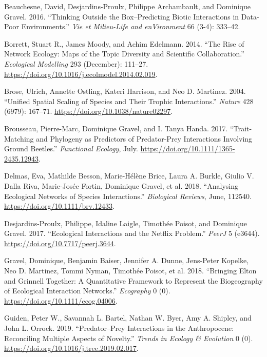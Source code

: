 \leavevmode\hypertarget{ref-BeauDesj16}{}%
Beauchesne, David, Desjardins-Proulx, Philippe Archambault, and
Dominique Gravel. 2016. ``Thinking Outside the Box--Predicting Biotic
Interactions in Data-Poor Environments.'' \emph{Vie et Milieu-Life and
enVironment} 66 (3-4): 333--42.

\leavevmode\hypertarget{ref-BorrMood14}{}%
Borrett, Stuart R., James Moody, and Achim Edelmann. 2014. ``The Rise of
Network Ecology: Maps of the Topic Diversity and Scientific
Collaboration.'' \emph{Ecological Modelling} 293 (December): 111--27.
\url{https://doi.org/10.1016/j.ecolmodel.2014.02.019}.

\leavevmode\hypertarget{ref-BrosOstl04}{}%
Brose, Ulrich, Annette Ostling, Kateri Harrison, and Neo D. Martinez.
2004. ``Unified Spatial Scaling of Species and Their Trophic
Interactions.'' \emph{Nature} 428 (6979): 167--71.
\url{https://doi.org/10.1038/nature02297}.

\leavevmode\hypertarget{ref-BrouGrav17}{}%
Brousseau, Pierre-Marc, Dominique Gravel, and I. Tanya Handa. 2017.
``Trait-Matching and Phylogeny as Predictors of Predator-Prey
Interactions Involving Ground Beetles.'' \emph{Functional Ecology},
July. \url{https://doi.org/10.1111/1365-2435.12943}.

\leavevmode\hypertarget{ref-DelmBess18}{}%
Delmas, Eva, Mathilde Besson, Marie-Hélène Brice, Laura A. Burkle,
Giulio V. Dalla Riva, Marie-Josée Fortin, Dominique Gravel, et al. 2018.
``Analysing Ecological Networks of Species Interactions.''
\emph{Biological Reviews}, June, 112540.
\url{https://doi.org/10.1111/brv.12433}.

\leavevmode\hypertarget{ref-DesjLaig17}{}%
Desjardins-Proulx, Philippe, Idaline Laigle, Timothée Poisot, and
Dominique Gravel. 2017. ``Ecological Interactions and the Netflix
Problem.'' \emph{PeerJ} 5 (e3644).
\url{https://doi.org/10.7717/peerj.3644}.

\leavevmode\hypertarget{ref-GravBais18}{}%
Gravel, Dominique, Benjamin Baiser, Jennifer A. Dunne, Jens-Peter
Kopelke, Neo D. Martinez, Tommi Nyman, Timothée Poisot, et al. 2018.
``Bringing Elton and Grinnell Together: A Quantitative Framework to
Represent the Biogeography of Ecological Interaction Networks.''
\emph{Ecography} 0 (0). \url{https://doi.org/10.1111/ecog.04006}.

\leavevmode\hypertarget{ref-GuidBart19}{}%
Guiden, Peter W., Savannah L. Bartel, Nathan W. Byer, Amy A. Shipley,
and John L. Orrock. 2019. ``Predator--Prey Interactions in the
Anthropocene: Reconciling Multiple Aspects of Novelty.'' \emph{Trends in
Ecology \& Evolution} 0 (0).
\url{https://doi.org/10.1016/j.tree.2019.02.017}.

